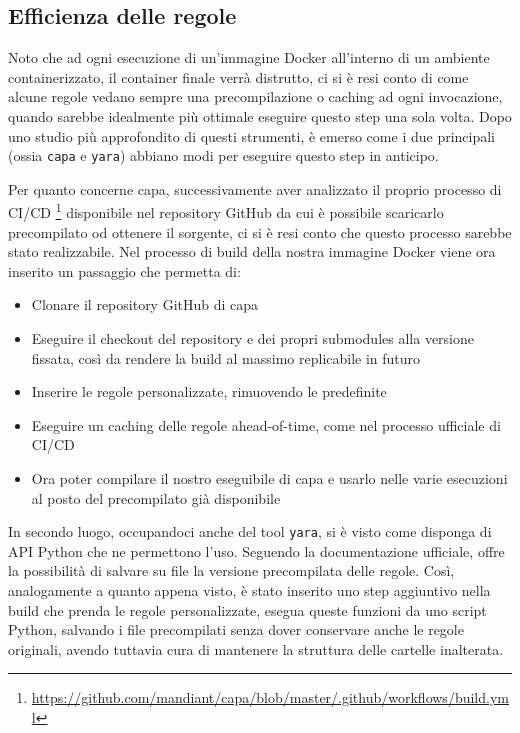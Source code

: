 \subsection{Efficienza delle regole}
Noto che ad ogni esecuzione di un'immagine Docker all'interno di un ambiente containerizzato, il container finale verrà distrutto, ci si è resi conto di come alcune regole vedano sempre una precompilazione o caching ad ogni invocazione, quando sarebbe idealmente più ottimale eseguire questo step una sola volta.
Dopo uno studio più approfondito di questi strumenti, è emerso come i due principali (ossia \texttt{capa} e \texttt{yara}) abbiano modi per eseguire questo step in anticipo.

Per quanto concerne capa, successivamente aver analizzato il proprio processo di CI/CD
\footnote{\url{https://github.com/mandiant/capa/blob/master/.github/workflows/build.yml}}
disponibile nel repository GitHub da cui è possibile scaricarlo precompilato od ottenere il sorgente, ci si è resi conto che questo processo sarebbe stato realizzabile.
Nel processo di build della nostra immagine Docker viene ora inserito un passaggio che permetta di:
\begin{itemize}
    \item Clonare il repository GitHub di capa
    \item Eseguire il checkout del repository e dei propri submodules alla versione fissata, così da rendere la build al massimo replicabile in futuro
    \item Inserire le regole personalizzate, rimuovendo le predefinite
    \item Eseguire un caching delle regole ahead-of-time, come nel processo ufficiale di CI/CD
    \item Ora poter compilare il nostro eseguibile di capa e usarlo nelle varie esecuzioni al posto del precompilato già disponibile
\end{itemize}

In secondo luogo, occupandoci anche del tool \texttt{yara}, si è visto come disponga di API Python che ne permettono l'uso. Seguendo la documentazione ufficiale, offre la possibilità di salvare su file la versione precompilata delle regole.
Così, analogamente a quanto appena visto, è stato inserito uno step aggiuntivo nella build che prenda le regole personalizzate, esegua queste funzioni da uno script Python, salvando i file precompilati senza dover conservare anche le regole originali, avendo tuttavia cura di mantenere la struttura delle cartelle inalterata.

